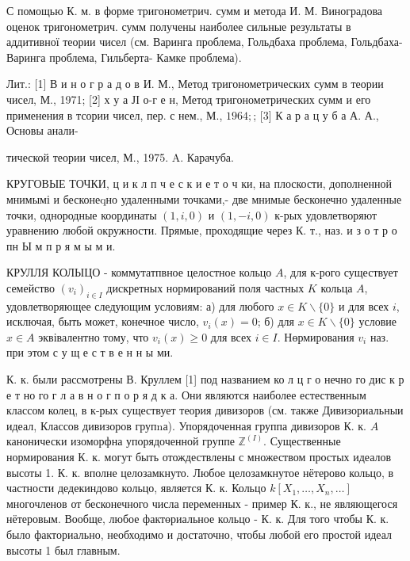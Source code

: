 \documentclass[10pt]{article}
\begin{document}
С помощью К. м. в форме тригонометрич. сумм и метода И. М. Виноградова оценок тригонометрич. сумм получены наиболее сильные результаты в аддитивної теории чисел (см. Варинга проблема, Гольдбаха проблема, Гольдбаха-Варинга проблема, Гильберта- Камке проблема).



Лит.: [1] В и н о г р а д о в И. М., Метод тригонометрических сумм в теории чисел, М., 1971; [2] х у а ЈІ о-г е н, Метод тригонометрических сумм и его применения в тсории чисел, пер. с нем., М., $1964 ;$; [3] К а р а ц у б а А. А., Основы анали-

тической теории чисел, М., 1975. A. Карачуба.



КРУГОВЫЕ ТОЧКИ, ц и к л п ч е с к и е т о ч ки, на плоскости, дополненной мнимымі и бесконеqно удаленными точками,- две мнимые бесконечно удаленные точки, однородные координаты $(1, i, 0)$ и $(1,-i, 0)$ к-рых удовлетворяют уравнению любой окружности. Прямые, проходящие через К. т., наз. и з о т р о пн Ы м п р я м ы м и.



КРУЛЛЯ КОЛЫЦО - коммутатпвное целостное кольцо $A$, для к-рого существует семейство $\left(v_{i}\right)_{i \in I}$ дискретных нормирований поля частных $K$ кольца $A$, удовлетворяющее следующим условиям: а) для любого $x \in K \backslash\{0\}$ и для всех $i$, исключая, быть может, конечное число, $v_{i}(x)=0$; б) для $x \in K \backslash\{0\}$ условие $x \in A$ эквівалентно тому, что $v_{i}(x) \geqslant 0$ для всех $i \in I$. Нөрмирования $v_{i}$ наз. при этом с у щ е с т в е н н ы ми.



К. к. были рассмотрены В. Круллем [1] под названием ко л ц г о нечно го дис к р е т но го г л а в н о г п о р я д к а. Они являются наиболее естественным классом колец, в к-рых существует теория дивизоров (см. также Дивизориальныи идеал, Классов дивизоров групnа). Упорядоченная группа дивизоров К. к. $A$ канонически изоморфна упорядоченной группе $\mathbb{Z}^{(I)}$. Существенные нормирования К. к. могут быть отождествлены с множеством простых идеалов высоты 1. К. к. вполне целозамкнуто. Любое целозамкнутое нётерово кольцо, в частности дедекиндово кольцо, является К. к. Кольцо $k\left[X_{1}, \ldots, X_{n}, \ldots\right]$ многочленов от бесконечного числа переменных - пример $К$. к., не являющегося нётеровым. Вообще, любое фактөриальное кольцо - К. к. Для того чтобы К. к. было факториально, необходимо и достаточно, чтобы любой его простой идеал высоты 1 был главным.
\end{document}
